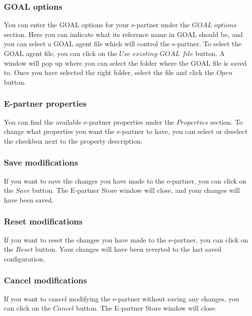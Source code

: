 \subsubsection{GOAL options}
You can enter the GOAL options for your e-partner under the $GOAL$ $options$ section. Here you can indicate what its reference name in GOAL should be, and you can select a GOAL agent file which will control the e-partner. To select the GOAL agent file, you can click on the $Use$ $existing$ $GOAL$ $file$ button. A window will pop up where you can select the folder where the GOAL file is saved to. Once you have selected the right folder, select the file and click the $Open$ button.

\subsubsection{E-partner properties}
You can find the available e-partner properties under the $Properties$ section. To change what properties you want the e-partner to have, you can select or deselect the checkbox next to the property description.

\subsubsection{Save modifications}
If you want to save the changes you have made to the e-partner, you can click on the $Save$ button. The E-partner Store window will close, and your changes will have been saved.

\subsubsection{Reset modifications}
If you want to reset the changes you have made to the e-partner, you can click on the $Reset$ button. Your changes will have been reverted to the last saved configuration.

\subsubsection{Cancel modifications}
If you want to cancel modifying the e-partner without saving any changes, you can click on the $Cancel$ button. The E-partner Store window will close.
